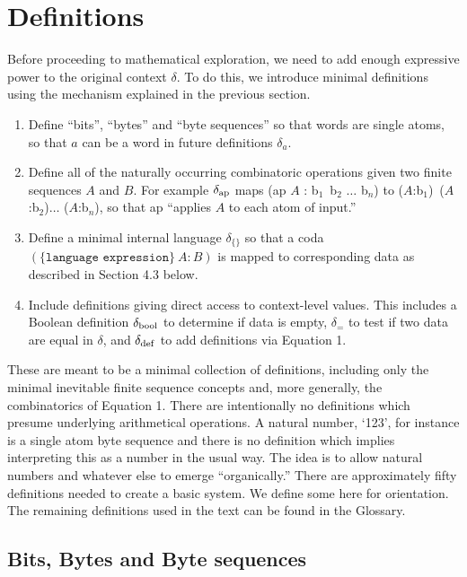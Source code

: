 \documentclass[11pt]{article}
\begin{document}
\section{Definitions}

     Before proceeding to mathematical exploration, we need to add enough expressive power to the original context $\delta$.  To do this, 
we introduce minimal definitions using the mechanism explained in the previous section.  

\begin{enumerate}
\item {Define ``bits'', ``bytes'' and ``byte sequences'' so that words are single atoms, so that $a$ can be a word in future definitions $\delta_a$.}
\item {Define all of the naturally occurring combinatoric operations given two finite sequences $A$ and $B$.  For example $\delta_{\rm ap}$
maps (ap $A$ : b$_1$\ b$_2$ $\dots$ b$_n$) to ($A$:b$_1$)\ ($A$:b$_2$)$\dots$ ($A$:b$_n$), so that ap ``applies $A$ to each atom of input.'' }
\item {Define a minimal internal language $\delta_{\{\}}$ so that a coda $(\{\texttt{language expression}\}\ A : B)$ is mapped to corresponding 
data as described in Section 4.3 below.}
\item {Include definitions giving direct access to context-level values.  This includes a Boolean definition $\delta_{\rm bool}$ to determine if data is empty, 
$\delta_{=}$ to test if two data are equal in $\delta$, and $\delta_{\rm def}$ to add definitions via Equation 1.} 
\end{enumerate}
These are meant to be a minimal collection of definitions, including only the minimal inevitable finite sequence concepts and, more generally, 
the combinatorics of Equation 1.  There are intentionally no definitions which presume underlying arithmetical operations.  A natural number, 
`123', for instance is a single atom byte sequence and there is no definition which implies interpreting this as a number in the usual way.  The idea is
to allow natural numbers and whatever else to emerge ``organically.'' 
There are approximately fifty definitions needed to create a basic system.  We define some here for orientation.  The remaining definitions used 
in the text can be found in the Glossary.

\subsection{Bits, Bytes and Byte sequences}
\end{document}
